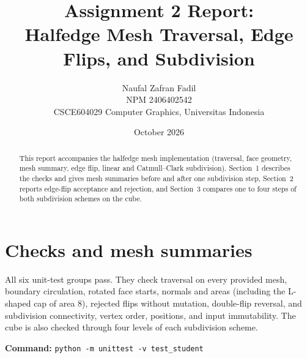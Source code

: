 \documentclass[11pt,a4paper]{article}
\title{Assignment 2 Report:\\Halfedge Mesh Traversal, Edge Flips, and Subdivision}
\author{Naufal Zafran Fadil\\[2pt]\small NPM 2406402542\\[2pt]\small CSCE604029 Computer Graphics, Universitas Indonesia}
\date{October 2026}
\newcommand{\code}[1]{\texttt{#1}}
\begin{document}
\maketitle

\begin{abstract}
This report accompanies the halfedge mesh implementation (traversal, face
geometry, mesh summary, edge flip, linear and Catmull--Clark subdivision).
Section~1 describes the checks and gives mesh summaries before and after one
subdivision step, Section~2 reports edge-flip acceptance and rejection, and
Section~3 compares one to four steps of both subdivision schemes on the cube.
\end{abstract}

\section{Checks and mesh summaries}
All six unit-test groups pass. They check traversal on every provided mesh,
boundary circulation, rotated face starts, normals and areas (including the
L-shaped cap of area 8), rejected flips without mutation, double-flip reversal,
and subdivision connectivity, vertex order, positions, and input immutability.
The cube is also checked through four levels of each subdivision scheme.

\textbf{Command:} \code{python -m unittest -v test\_student}
\end{document}
